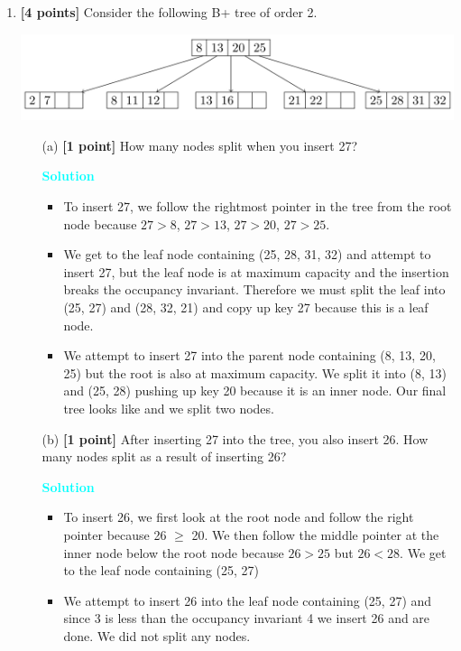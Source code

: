 \documentclass[10pt]{article}
\newenvironment{solution}
    { \begin{mdframed}[backgroundcolor=gray!10] \textcolor{cyan}{\textbf{Solution}} \\}
    {  \end{mdframed}}
\begin{document}
\begin{enumerate}
	\item \textbf{[4 points]}
	      Consider the following B+ tree of order 2.
	      \begin{center}
		      \includegraphics[scale=0.25]{Btree.png}
	      \end{center}
	      \begin{itemize}
		      \item[(a)] \textbf{[1 point]} How many nodes split when you insert 27?
		            \begin{solution}
			            \begin{itemize}
				            \item To insert 27, we follow the rightmost pointer in the tree from the root node because
				                  $27 > 8$, $27 > 13$, $27 > 20$, $27 > 25$.
				            \item We get to the leaf node containing (25, 28, 31, 32) and attempt to insert 27, but the leaf node
				                  is at maximum capacity and the insertion breaks the occupancy invariant. Therefore we must
				                  split the leaf into (25, 27) and (28, 32, 21) and copy up key 27 because this is a leaf node.
				            \item We attempt to insert 27 into the parent node containing (8, 13, 20, 25) but the root is also at
				                  maximum capacity. We split it into (8, 13) and (25, 28) pushing up key 20 because it is an
				                  inner node. Our final tree looks like and we split two nodes.
			            \end{itemize}
		            \end{solution}

		      \item[(b)] \textbf{[1 point]} After inserting 27 into the tree, you also insert 26. How many nodes split as a result of inserting
		            26?
		            \begin{solution}
			            \begin{itemize}
				            \item To insert 26, we first look at the root node and follow the right pointer because 26 $\geq$ 20. We
				                  then follow the middle pointer at the inner node below the root node because $26 > 25$ but
				                  $26 < 28$. We get to the leaf node containing (25, 27)
				            \item We attempt to insert 26 into the leaf node containing (25, 27) and since 3 is less than the
				                  occupancy invariant 4 we insert 26 and are done. We did not split any nodes.
			            \end{itemize}
		            \end{solution}


\end{itemize}
\end{enumerate}
\end{document}
